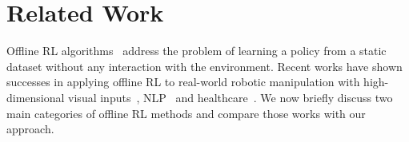 \section{Related Work}
\label{sec:related}



Offline RL algorithms~\citep{ernst2005tree, riedmiller2005neural, LangeGR12, levine2020offline} address the problem of learning a policy from a static dataset without any interaction with the environment. 
Recent works have shown successes in applying offline RL to real-world robotic manipulation  with high-dimensional visual inputs~\citep{ kalashnikov2018scalable, mandlekar2020iris, Rafailov2020LOMPO,singh2020cog}, NLP~\citep{jaques2019way,jaques2020human} and healthcare~\citep{shortreed2011informing, Wang2018SupervisedRL}.
We now briefly discuss two main categories of offline RL methods and compare those works with our approach.



